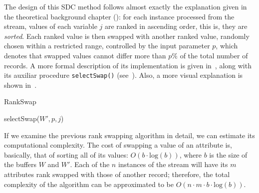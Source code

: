 The design of this SDC method follows almost exactly the explanation given in the theoretical background chapter (): for each instance processed from the stream, values of each variable $j$ are ranked in ascending order, this is, they are \textit{sorted}. Each ranked value is then swapped with another ranked value, randomly chosen within a restricted range, controlled by the input parameter $p$, which denotes that swapped values cannot differ more than $p\%$ of the total number of records. A more formal description of its implementation is given in~, along with its auxiliar procedure \texttt{selectSwap()} (see~). Also, a more visual explanation is shown in~.

\begin{algorithm}[H]
\caption{RankSwap\label{al:rank-swapping}}
\end{algorithm}

\begin{procedure}
\caption{selectSwap($W',p,j$)\label{al:select-swap}}
\end{procedure}

If we examine the previous rank swapping algorithm in detail, we can estimate its computational complexity. The cost of swapping a value of an attribute is, basically, that of sorting all of its values: $O(b \cdot \mathrm{log}(b))$, where $b$ is the size of the buffers $W$ and $W'$. Each of the $n$ instances of the stream will have its $m$ attributes rank swapped with those of another record; therefore, the total complexity of the algorithm can be approximated to be $O(n \cdot m \cdot b \cdot \mathrm{log}(b))$.

